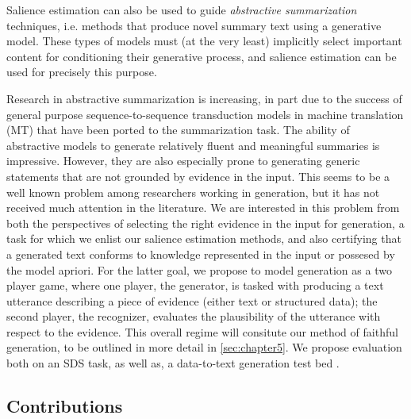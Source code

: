 Salience estimation can also be used to guide 
\emph{abstractive summarization} techniques, i.e. methods that produce novel
summary text using a generative model. These types of models 
must (at the very least) implicitly select important content for conditioning 
their
generative process, and salience estimation can be used for precisely this 
purpose. 

Research in abstractive summarization is increasing, in part due to
the success of general purpose sequence-to-sequence transduction models 
in machine translation (MT) that have been ported to the summarization task.
The ability of abstractive models to generate relatively fluent and 
meaningful summaries is impressive. However, they are also especially prone 
to generating generic statements that are not grounded by evidence in the 
input. This seems to be a well known problem among researchers working
in generation, but it has not received much attention in the literature.
We are interested in this problem from both the perspectives of selecting
the right evidence in the input for generation, a task for which we enlist
our salience estimation methods, and also certifying that a generated text
conforms to knowledge represented in the input or possesed by the model
apriori. For the latter goal, we propose to model generation as a two player
game, where one player, the generator, is tasked with producing a text
utterance describing a piece of evidence (either text or structured data);
the second player, the recognizer, %
evaluates the plausibility of the utterance with respect to the evidence.
This overall regime will consitute our method of faithful generation,
to be outlined in more detail in \autoref{sec:chapter5}. We propose 
evaluation both on an SDS task, as well as, a data-to-text generation 
test bed \citep{wiseman2017challenges}.

\subsection{Contributions}

